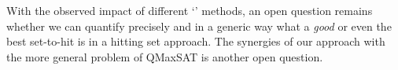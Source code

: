 

With the observed impact of different `\grow' methods, an open question remains whether we can quantify precisely and in a generic way what a \textit{good} or even the best set-to-hit is in a hitting set approach. 
%
%
The synergies of our approach with the more general problem of QMaxSAT \cite{DBLP:journals/constraints/IgnatievJM16} is another open question.


